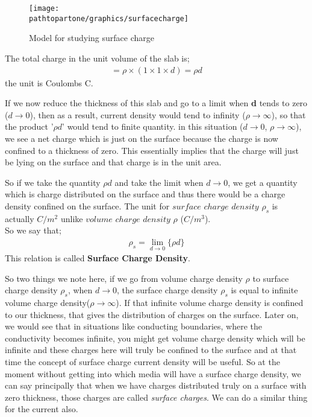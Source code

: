 \begin{figure}[h]
\centering
\texttt{[image: \\pathtopartone/graphics/surfacecharge]}
\caption{Model for studying surface charge}
\label{fig:surfacecharge}
\end{figure} 

The total charge in the unit volume of the slab is;
\begin{align*}
=\rho\times(1\times 1\times d)=\rho d
\end{align*}
the unit is Coulombs C.

If we now reduce the thickness of this slab and go to a limit when \textbf{d} tends to zero ($d\rightarrow 0$), then as a result, current density would tend to infinity ($\rho\rightarrow\infty$), so that the product '$\rho d$' would tend to finite quantity. in this situation ($d\rightarrow 0$, $\rho\rightarrow\infty$), we see a net charge which is just on the surface because the charge is now confined to a thickness of zero. This essentially implies that the charge will just be lying on the surface and that charge is in the unit area. 


So if we take the quantity $\rho d$ and take the limit when $d\rightarrow0$, we get a quantity which is charge distributed on the surface and thus there would be a charge density confined on the surface. The unit for $surface$ $charge$ $density$ $\rho_{s}$ is actually $C/m^{2}$ unlike $volume$ $charge$ $density$ $\rho$ ($C/m^{3}$).\\
So we say that;
\begin{align}
\rho_{s}=\lim_{d\rightarrow0}\{\rho d\} 
\end{align}
This relation is called \textbf{Surface Charge Density}.

So two things we note here, if we go from volume charge density $\rho$ to surface charge density $\rho_{s}$, when $d\rightarrow0$, the surface charge density $\rho_{s}$ is equal to infinite volume charge density($\rho\rightarrow\infty$). If that infinite volume charge density is confined to our thickness, that gives the distribution of charges on the surface. Later on, we would see that in situations like conducting boundaries, where the conductivity becomes infinite, you might get volume charge density which will be infinite and these charges here will truly be confined to the surface and at that time the concept of surface charge current density will be useful. So at the moment without getting into which media will have a surface charge density, we can say principally that when we have charges distributed truly on a surface with zero thickness, those charges are called \textit{surface charges}. We can do a similar thing for the current also.

